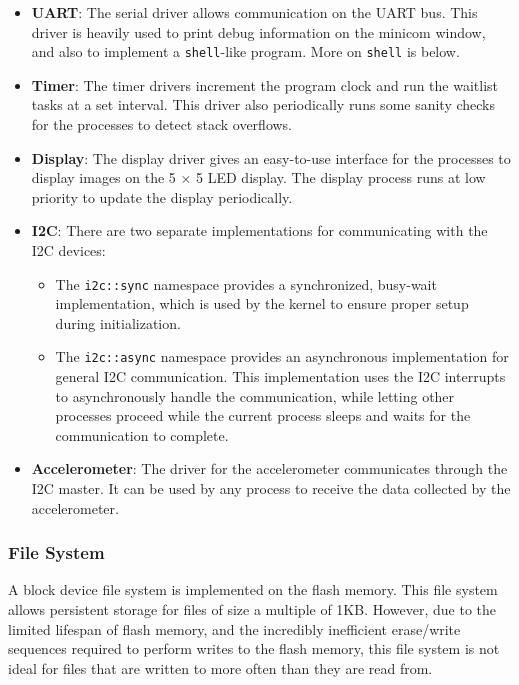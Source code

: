 \documentclass[oxford]{ahsan}
\begin{document}
\begin{itemize}
    \item \textbf{UART}: The serial driver allows communication on the UART bus. This
        driver is heavily used to print debug information on the minicom window, and
        also to implement a \texttt{shell}-like program. More on \texttt{shell} is
        below.

    \item \textbf{Timer}: The timer drivers increment the program clock and run the
        waitlist tasks at a set interval. This driver also periodically runs some
        sanity checks for the processes to detect stack overflows.

    \item \textbf{Display}: The display driver gives an easy-to-use interface for the
        processes to display images on the 5 × 5 LED display. The display process runs
        at low priority to update the display periodically.

    \item \textbf{I2C}: There are two separate implementations for communicating with
        the I2C devices:
        \begin{itemize}
            \item The \texttt{i2c::sync} namespace provides a synchronized, busy-wait
                implementation, which is used by the kernel to ensure proper setup
                during initialization.
            \item The \texttt{i2c::async} namespace provides an asynchronous
                implementation for general I2C communication. This implementation uses
                the I2C interrupts to asynchronously handle the communication, while
                letting other processes proceed while the current process sleeps and
                waits for the communication to complete.
        \end{itemize}

    \item \textbf{Accelerometer}: The driver for the accelerometer communicates through
        the I2C master. It can be used by any process to receive the data collected by
        the accelerometer.
\end{itemize}


\subsubsection*{File System}

A block device file system is implemented on the flash memory. This file system allows
persistent storage for files of size a multiple of 1KB. However, due to the limited
lifespan of flash memory, and the incredibly inefficient erase/write sequences required
to perform writes to the flash memory, this file system is not ideal for files that are
written to more often than they are read from.
\end{document}
